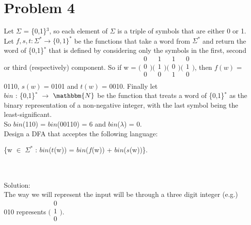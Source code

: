 \documentclass{article}
\newcommand*\moveToRight[1]{\hspace*{0em plus 1fill}\makebox{(#1)}}
\begin{document}
\section{Problem 4}
Let $\Sigma$ = \{0,1\}$^3$, so each element of $\Sigma$ is a triple of symbols that are either 0 or 1.\\ Let $f, s, t : \Sigma^* \to \{0, 1\}^*$ be the functions that take a word from $\Sigma^*$ and return the word of \{0,1\}$^*$ that is defined by considering only the symbols in the first, second or third (respectively) component. So if w = 
$\bigl(\begin{smallmatrix}
    0\\
    0\\
    0\\
\end{smallmatrix}\bigr)
\bigl(\begin{smallmatrix}
    1\\
    1\\
    0\\
\end{smallmatrix}\bigr)
\bigl(\begin{smallmatrix}
    1\\
    0\\
    1\\
\end{smallmatrix}\bigr)
\bigl(\begin{smallmatrix}
    0\\
    1\\
    0\\
\end{smallmatrix}\bigr)$, then $f(w)$ = 0110, $s(w)$ = 0101 and $t(w)$ = 0010. Finally let \\$bin$ : \{0,1\}$^*$ $\to$ $\mathbbm{N}$ be the function that treats a word of \{0,1\}$^*$ as the binary representation of a non-negative integer, with the last symbol being the least-significant.\\ So $bin$(110) = $bin$(00110) = 6 and $bin$($\lambda$) = 0.\\
Design a DFA that acceptes the following language:
\begin{center}
\{w $\in$ $\Sigma^*$ : $bin$($t$(w)) = $bin$($f$(w)) + $bin$($s$(w))\}.\\ \moveToRight{10 marks}\\    
\end{center}\\Solution:\\
The way we will represent the input will be through a three digit integer (e.g.) 010 represents $\bigl(\begin{smallmatrix}
    0\\
    1\\
    0\\
\end{smallmatrix}\bigr)$.\\
\end{document}
